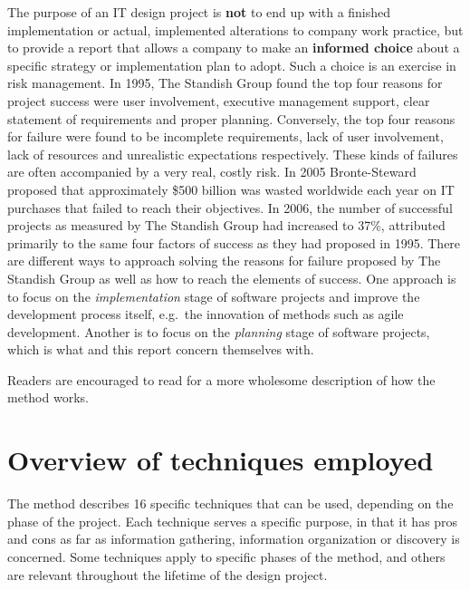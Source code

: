 The purpose of an IT design project is \textbf{not} to end up with a
finished implementation or actual, implemented alterations to company work
practice, but to provide a report that allows a company to make an
\textbf{informed choice} about a specific strategy or implementation plan to
adopt. Such a choice is an exercise in risk management. In 1995, The Standish
Group found the top four reasons for project success were user involvement,
executive management support, clear statement of requirements and proper
planning\cite{standish1995chaos}. Conversely, the top four reasons for failure
were found to be incomplete requirements, lack of user involvement, lack of
resources and unrealistic expectations respectively\cite{standish1995chaos}.
These kinds of failures are often accompanied by a very real, costly risk. In
2005 Bronte-Steward proposed that approximately \$500 billion was wasted
worldwide each year on IT purchases that failed to reach their
objectives\cite{bronte2005developing}. In 2006, the number of successful
projects as measured by The Standish Group\cite{standish2012} had increased to
37\%, attributed primarily to the same four factors of success as they had
proposed in 1995. There are different ways to approach solving the reasons for
failure proposed by The Standish Group as well as how to reach the elements of
success. One approach is to focus on the \textit{implementation} stage of
software projects and improve the development process itself, e.g.\ the
innovation of methods such as agile development. Another is to focus on the
\textit{planning} stage of software projects, which is what \must{} and this
report concern themselves with.

Readers are encouraged to read \cite{bodker2004participatory} for a more
wholesome description of how the \must{} method works.

\section{Overview of techniques employed} \label{sec:overview}
The \must{} method describes 16 specific techniques that can be used, depending
on the phase of the project. Each technique serves a specific purpose, in that it
has pros and cons as far as information gathering, information organization or discovery
is concerned. Some techniques apply to specific phases of the \must{} method, and others
are relevant throughout the lifetime of the design project.


